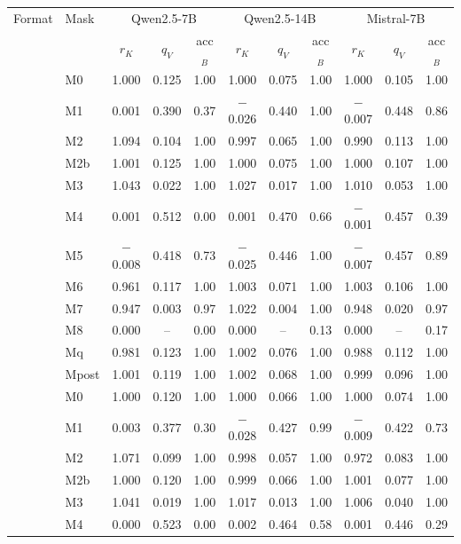 \begin{tabular}{@{}llccccccccc@{}}
\toprule
Format & Mask & \multicolumn{3}{c}{Qwen2.5-7B} & \multicolumn{3}{c}{Qwen2.5-14B} & \multicolumn{3}{c}{Mistral-7B} \\
\cmidrule(lr){3-5}\cmidrule(lr){6-8}\cmidrule(lr){9-11}
 & & $r_K$ & $q_V$ & acc$_B$ & $r_K$ & $q_V$ & acc$_B$ & $r_K$ & $q_V$ & acc$_B$ \\
\midrule
\fmtListA{} & M0 & 1.000 & 0.125 & 1.00 & 1.000 & 0.075 & 1.00 & 1.000 & 0.105 & 1.00 \\
 & M1 & 0.001 & 0.390 & 0.37 & $-$0.026 & 0.440 & 1.00 & $-$0.007 & 0.448 & 0.86 \\
 & M2 & 1.094 & 0.104 & 1.00 & 0.997 & 0.065 & 1.00 & 0.990 & 0.113 & 1.00 \\
 & M2b & 1.001 & 0.125 & 1.00 & 1.000 & 0.075 & 1.00 & 1.000 & 0.107 & 1.00 \\
 & M3 & 1.043 & 0.022 & 1.00 & 1.027 & 0.017 & 1.00 & 1.010 & 0.053 & 1.00 \\
 & M4 & 0.001 & 0.512 & 0.00 & 0.001 & 0.470 & 0.66 & $-$0.001 & 0.457 & 0.39 \\
 & M5 & $-$0.008 & 0.418 & 0.73 & $-$0.025 & 0.446 & 1.00 & $-$0.007 & 0.457 & 0.89 \\
 & M6 & 0.961 & 0.117 & 1.00 & 1.003 & 0.071 & 1.00 & 1.003 & 0.106 & 1.00 \\
 & M7 & 0.947 & 0.003 & 0.97 & 1.022 & 0.004 & 1.00 & 0.948 & 0.020 & 0.97 \\
 & M8 & 0.000 & -- & 0.00 & 0.000 & -- & 0.13 & 0.000 & -- & 0.17 \\
 & Mq & 0.981 & 0.123 & 1.00 & 1.002 & 0.076 & 1.00 & 0.988 & 0.112 & 1.00 \\
 & Mpost & 1.001 & 0.119 & 1.00 & 1.002 & 0.068 & 1.00 & 0.999 & 0.096 & 1.00 \\
\midrule
\fmtOpt{} & M0 & 1.000 & 0.120 & 1.00 & 1.000 & 0.066 & 1.00 & 1.000 & 0.074 & 1.00 \\
 & M1 & 0.003 & 0.377 & 0.30 & $-$0.028 & 0.427 & 0.99 & $-$0.009 & 0.422 & 0.73 \\
 & M2 & 1.071 & 0.099 & 1.00 & 0.998 & 0.057 & 1.00 & 0.972 & 0.083 & 1.00 \\
 & M2b & 1.000 & 0.120 & 1.00 & 0.999 & 0.066 & 1.00 & 1.001 & 0.077 & 1.00 \\
 & M3 & 1.041 & 0.019 & 1.00 & 1.017 & 0.013 & 1.00 & 1.006 & 0.040 & 1.00 \\
 & M4 & 0.000 & 0.523 & 0.00 & 0.002 & 0.464 & 0.58 & 0.001 & 0.446 & 0.29 \\

\end{tabular}
